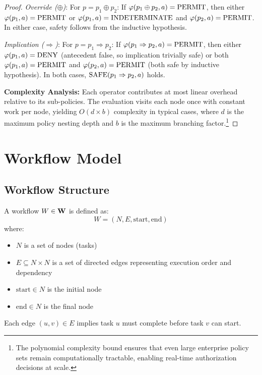 \begin{proof}
\emph{Override ($\oplus$)}: For $p = p_1 \oplus p_2$: If $\varphi(p_1 \oplus p_2, a) = \text{PERMIT}$, then either $\varphi(p_1, a) = \text{PERMIT}$ or $\varphi(p_1, a) = \text{INDETERMINATE}$ and $\varphi(p_2, a) = \text{PERMIT}$. In either case, safety follows from the inductive hypothesis.

\emph{Implication ($\Rightarrow$)}: For $p = p_1 \Rightarrow p_2$: If $\varphi(p_1 \Rightarrow p_2, a) = \text{PERMIT}$, then either $\varphi(p_1, a) = \text{DENY}$ (antecedent false, so implication trivially safe) or both $\varphi(p_1, a) = \text{PERMIT}$ and $\varphi(p_2, a) = \text{PERMIT}$ (both safe by inductive hypothesis). In both cases, $\text{SAFE}(p_1 \Rightarrow p_2, a)$ holds.

\textbf{Complexity Analysis:}
Each operator contributes at most linear overhead relative to its sub-policies. The evaluation visits each node once with constant work per node, yielding $O(d \times b)$ complexity in typical cases, where $d$ is the maximum policy nesting depth and $b$ is the maximum branching factor.\footnote{The polynomial complexity bound ensures that even large enterprise policy sets remain computationally tractable, enabling real-time authorization decisions at scale.}
\end{proof}

\newpage

\section{Workflow Model}

\subsection{Workflow Structure}

\begin{definition}
\label{def:workflow-structure}
A workflow $W \in \mathbf{W}$ is defined as:
\begin{equation}
W = (N, E, \text{start}, \text{end})
\end{equation}
where:
\begin{itemize}
\item $N$ is a set of nodes (tasks)
\item $E \subseteq N \times N$ is a set of directed edges representing execution order and dependency
\item $\text{start} \in N$ is the initial node
\item $\text{end} \in N$ is the final node
\end{itemize}
Each edge $(u, v) \in E$ implies task $u$ must complete before task $v$ can start.
\end{definition}

